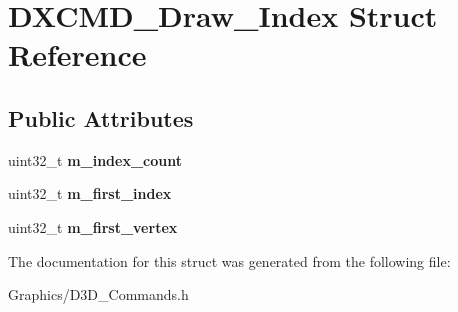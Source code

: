 \hypertarget{structDXCMD__Draw__Index}{}\section{D\+X\+C\+M\+D\+\_\+\+Draw\+\_\+\+Index Struct Reference}
\label{structDXCMD__Draw__Index}
\subsection*{Public Attributes}
\begin{DoxyCompactItemize}
\item 
\mbox{\label{structDXCMD__Draw__Index_adb188d5bc544f92c002ccf64d1ce3d14}} 
uint32\+\_\+t {\bfseries m\+\_\+index\+\_\+count}
\item 
\mbox{\label{structDXCMD__Draw__Index_a72bfe20c5add3af17a5128c3920b68d0}} 
uint32\+\_\+t {\bfseries m\+\_\+first\+\_\+index}
\item 
\mbox{\label{structDXCMD__Draw__Index_aa9a08ef394669058380a022b15d34e52}} 
uint32\+\_\+t {\bfseries m\+\_\+first\+\_\+vertex}
\end{DoxyCompactItemize}


The documentation for this struct was generated from the following file\+:\begin{DoxyCompactItemize}
\item 
Graphics/D3\+D\+\_\+\+Commands.\+h\end{DoxyCompactItemize}

